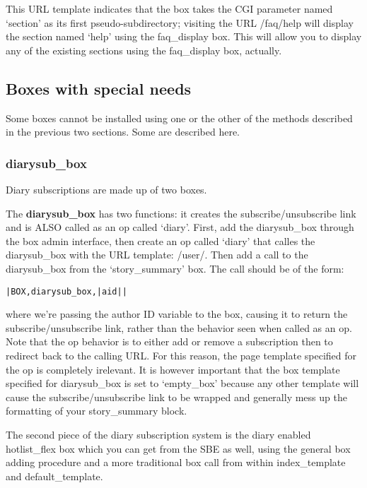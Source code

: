 This URL template indicates that the box takes the CGI parameter named `section' as its first pseudo-subdirectory; visiting the URL /faq/help will display the section named `help' using the faq\_display box. This will allow you to display any of the existing sections using the faq\_display box, actually.

\subsection{Boxes with special needs}
\label{sbe-other}

Some boxes cannot be installed using one or the other of the methods described in the previous two sections. Some are described here.

\subsubsection{diarysub\_box}
\label{sbe-diarysub}

Diary subscriptions are made up of two boxes.

The {\bf diarysub\_box} has two functions: it creates the subscribe/unsubscribe link and is ALSO called as an op called `diary'. First, add the diarysub\_box through the box admin interface, then create an op called `diary' that calles the diarysub\_box with the URL template: /user/. Then add a call to the diarysub\_box from the `story\_summary' box. The call should be of the form:
\begin{verbatim}
|BOX,diarysub_box,|aid||
\end{verbatim}
where we're passing the author ID variable to the box, causing it to return the subscribe/unsubscribe link, rather than the behavior seen when called as an op. Note that the op behavior is to either add or remove a subscription then to redirect back to the calling URL. For this reason, the page template specified for the op is completely irelevant. It is however important that the box template specified for diarysub\_box is set to `empty\_box' because any other template will cause the subscribe/unsubscribe link to be wrapped and generally mess up the formatting of your story\_summary block.

The second piece of the diary subscription system is the diary enabled hotlist\_flex box which you can get from the SBE as well, using the general box adding procedure and a more traditional box call from within index\_template and default\_template.

